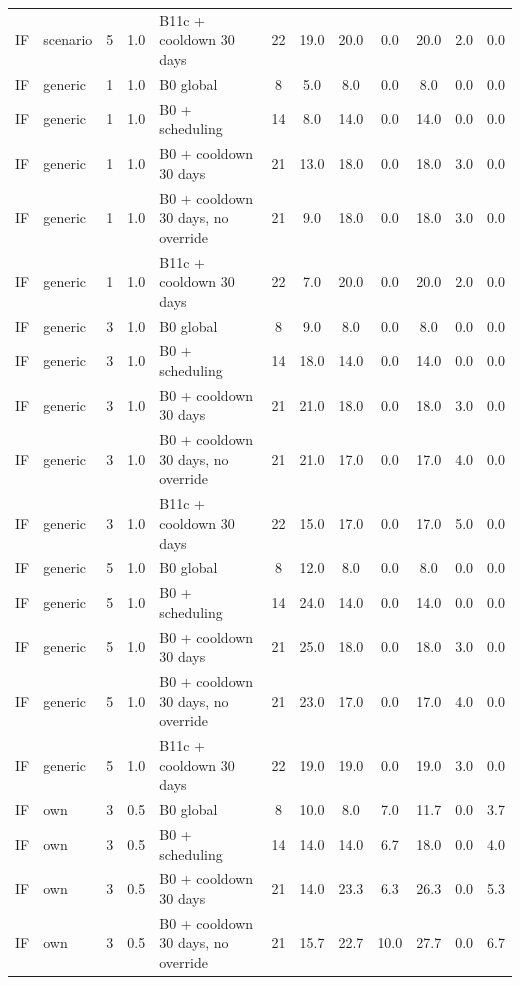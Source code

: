 \begin{longtable}{lllllccccccc}
IF & scenario & 5 & 1.0 & B11c + cooldown 30 days & 22 & 19.0 & 20.0 & 0.0 & 20.0 & 2.0 & 0.0 \\
IF & generic & 1 & 1.0 & B0 global & 8 & 5.0 & 8.0 & 0.0 & 8.0 & 0.0 & 0.0 \\
IF & generic & 1 & 1.0 & B0 + scheduling & 14 & 8.0 & 14.0 & 0.0 & 14.0 & 0.0 & 0.0 \\
IF & generic & 1 & 1.0 & B0 + cooldown 30 days & 21 & 13.0 & 18.0 & 0.0 & 18.0 & 3.0 & 0.0 \\
IF & generic & 1 & 1.0 & B0 + cooldown 30 days, no override & 21 & 9.0 & 18.0 & 0.0 & 18.0 & 3.0 & 0.0 \\
IF & generic & 1 & 1.0 & B11c + cooldown 30 days & 22 & 7.0 & 20.0 & 0.0 & 20.0 & 2.0 & 0.0 \\
IF & generic & 3 & 1.0 & B0 global & 8 & 9.0 & 8.0 & 0.0 & 8.0 & 0.0 & 0.0 \\
IF & generic & 3 & 1.0 & B0 + scheduling & 14 & 18.0 & 14.0 & 0.0 & 14.0 & 0.0 & 0.0 \\
IF & generic & 3 & 1.0 & B0 + cooldown 30 days & 21 & 21.0 & 18.0 & 0.0 & 18.0 & 3.0 & 0.0 \\
IF & generic & 3 & 1.0 & B0 + cooldown 30 days, no override & 21 & 21.0 & 17.0 & 0.0 & 17.0 & 4.0 & 0.0 \\
IF & generic & 3 & 1.0 & B11c + cooldown 30 days & 22 & 15.0 & 17.0 & 0.0 & 17.0 & 5.0 & 0.0 \\
IF & generic & 5 & 1.0 & B0 global & 8 & 12.0 & 8.0 & 0.0 & 8.0 & 0.0 & 0.0 \\
IF & generic & 5 & 1.0 & B0 + scheduling & 14 & 24.0 & 14.0 & 0.0 & 14.0 & 0.0 & 0.0 \\
IF & generic & 5 & 1.0 & B0 + cooldown 30 days & 21 & 25.0 & 18.0 & 0.0 & 18.0 & 3.0 & 0.0 \\
IF & generic & 5 & 1.0 & B0 + cooldown 30 days, no override & 21 & 23.0 & 17.0 & 0.0 & 17.0 & 4.0 & 0.0 \\
IF & generic & 5 & 1.0 & B11c + cooldown 30 days & 22 & 19.0 & 19.0 & 0.0 & 19.0 & 3.0 & 0.0 \\
IF & own & 3 & 0.5 & B0 global & 8 & 10.0 & 8.0 & 7.0 & 11.7 & 0.0 & 3.7 \\
IF & own & 3 & 0.5 & B0 + scheduling & 14 & 14.0 & 14.0 & 6.7 & 18.0 & 0.0 & 4.0 \\
IF & own & 3 & 0.5 & B0 + cooldown 30 days & 21 & 14.0 & 23.3 & 6.3 & 26.3 & 0.0 & 5.3 \\
IF & own & 3 & 0.5 & B0 + cooldown 30 days, no override & 21 & 15.7 & 22.7 & 10.0 & 27.7 & 0.0 & 6.7 \\

\end{longtable}
